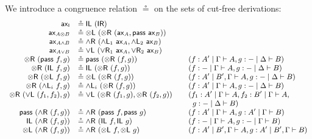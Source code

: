 \documentclass[submission,copyright,creativecommons]{eptcs}
\theoremstyle{definition}
\newcommand{\tl}{\otimes \mathsf{L}}
\newcommand{\tr}{\otimes \mathsf{R}}
\newcommand{\pass}{\mathsf{pass}}
\newcommand{\unitl}{\mathsf{IL}}
\newcommand{\unitr}{\mathsf{IR}}
\newcommand{\andlone}{\land \mathsf{L}_{1}}
\newcommand{\andltwo}{\land \mathsf{L}_{2}}
\newcommand{\andli}{\land \mathsf{L}_{i}}
\newcommand{\andr}{\land \mathsf{R}}
\newcommand{\orl}{\lor \mathsf{L}}
\newcommand{\orrone}{\lor \mathsf{R}_{1}}
\newcommand{\orrtwo}{\lor \mathsf{R}_{2}}
\newcommand{\ax}{\mathsf{ax}}
\newcommand{\ot}{\otimes}
\newcommand{\I}{\mathsf{I}}
\begin{document}
We introduce a congruence relation $\circeq$ on the sets of cut-free derivations:
  \begin{equation*}\label{fig:circeq}
  \small
  \begin{array}{rlll}
    \ax_{\I} &\circeq \unitl \text{ } (\unitr)
    \\
    \ax_{A \ot B} &\circeq \tl \text{ } (\tr \text{ } (\ax_{A} , \pass \text{ } \ax_{B}))
    \\
    \ax_{A \land B} &\circeq \andr \ (\andlone \ \ax_A , \andltwo \ \ax_B)
    \\
    \ax_{A \lor B} &\circeq \orl \ (\orrone \ \ax_A , \orrtwo \ \ax_B)
    \\
    \tr \text{ } (\pass \text{ } f, g) &\circeq \pass \text{ } (\tr \text{ } (f, g)) &&(f : A' \mid \Gamma \vdash A, g : {-} \mid \Delta \vdash B)
    \\
    \tr \text{ } (\unitl \text{ } f, g) &\circeq \unitl \text{ } (\tr \text{ } (f , g)) &&(f : {-} \mid \Gamma \vdash A , g : {-} \mid \Delta \vdash B)
    \\
    \tr \text{ } (\tl \text{ } f, g) &\circeq \tl \text{ } (\tr \text{ } (f , g)) &&(f : A' \mid B' , \Gamma \vdash A , g : {-} \mid \Delta \vdash B)
    \\
    \tr \ (\andli \ f , g) &\circeq \andli \ (\tr \ (f , g)) &&(f : A' \mid \Gamma \vdash A, g : - \mid \Delta \vdash B)
    \\
    \tr \ (\orl \ (f_1 , f_2) , g) &\circeq \orl \ (\tr \ (f_1 , g) , \tr \ (f_2 , g)) &&(f_1 : A' \mid \Gamma \vdash A , f_2 : B' \mid \Gamma \vdash A , \\
    & && \;\;g : - \mid \Delta \vdash B)
    \\
    \pass \ (\andr \ (f , g)) &\circeq  \andr \ (\pass \ f , \pass \ g) &&(f : A' \mid \Gamma \vdash A , g : A' \mid \Gamma \vdash B)
    \\
    \unitl \ (\andr \ (f , g)) &\circeq  \andr \ (\unitl \ f , \unitl \ g) &&(f : - \mid \Gamma \vdash A , g : - \mid \Gamma \vdash B)
    \\
    \tl \ (\andr \ (f , g)) &\circeq  \andr \ (\tl \ f , \tl \ g) &&(f : A' \mid B' , \Gamma \vdash A , g : A' \mid B' , \Gamma \vdash B)

\end{array}
\end{equation*}
\end{document}

